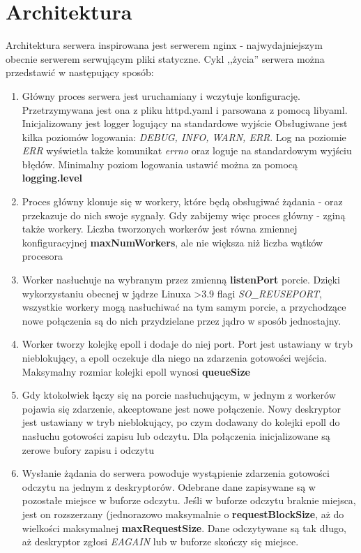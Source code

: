 \documentclass[a4paper]{article}
\begin{document}
\section{Architektura}
Architektura serwera inspirowana jest serwerem nginx - najwydajniejszym obecnie serwerem serwującym pliki statyczne. Cykl ,,życia'' serwera można przedstawić w następujący sposób:
\begin{enumerate}
    \item Główny proces serwera jest uruchamiany i wczytuje konfigurację. Przetrzymywana jest ona z pliku httpd.yaml i parsowana z pomocą libyaml. Inicjalizowany jest logger logujący na standardowe wyjście Obsługiwane jest kilka poziomów logowania: \emph{DEBUG, INFO, WARN, ERR}. Log na poziomie \emph{ERR} wyświetla także komunikat \emph{errno} oraz loguje na standardowym wyjściu błędów. Minimalny poziom logowania ustawić można za pomocą \textbf{logging.level}
    \item Proces główny klonuje się w workery, które będą obsługiwać żądania - oraz przekazuje do nich swoje sygnały. Gdy zabijemy więc proces główny - zginą także workery. Liczba tworzonych workerów jest równa zmiennej konfiguracyjnej \textbf{maxNumWorkers}, ale nie większa niż liczba wątków procesora
    \item Worker nasłuchuje na wybranym przez zmienną \textbf{listenPort} porcie. Dzięki wykorzystaniu obecnej w jądrze Linuxa >3.9 flagi \emph{SO\_REUSEPORT}, wszystkie workery mogą nasłuchiwać na tym samym porcie, a przychodzące nowe połączenia są do nich przydzielane przez jądro w sposób jednostajny.
    \item Worker tworzy kolejkę epoll i dodaje do niej port. Port jest ustawiany w tryb nieblokujący, a epoll oczekuje dla niego na zdarzenia gotowości wejścia. Maksymalny rozmiar kolejki epoll wynosi \textbf{queueSize}
    \item Gdy ktokolwiek łączy się na porcie nasłuchującym, w jednym z workerów pojawia się zdarzenie, akceptowane jest nowe połączenie. Nowy deskryptor jest ustawiany w tryb nieblokujący, po czym dodawany do kolejki epoll do nasłuchu gotowości zapisu lub odczytu. Dla połączenia inicjalizowane są zerowe bufory zapisu i odczytu
    \item Wysłanie żądania do serwera powoduje wystąpienie zdarzenia gotowości odczytu na jednym z deskryptorów. Odebrane dane zapisywane są w pozostałe miejsce w buforze odczytu. Jeśli w buforze odczytu braknie miejsca, jest on rozszerzany (jednorazowo maksymalnie o \textbf{requestBlockSize}, aż do wielkości maksymalnej \textbf{maxRequestSize}. Dane odczytywane są tak długo, aż deskryptor zgłosi \emph{EAGAIN} lub w buforze skończy się miejsce.

\end{enumerate}
\end{document}
